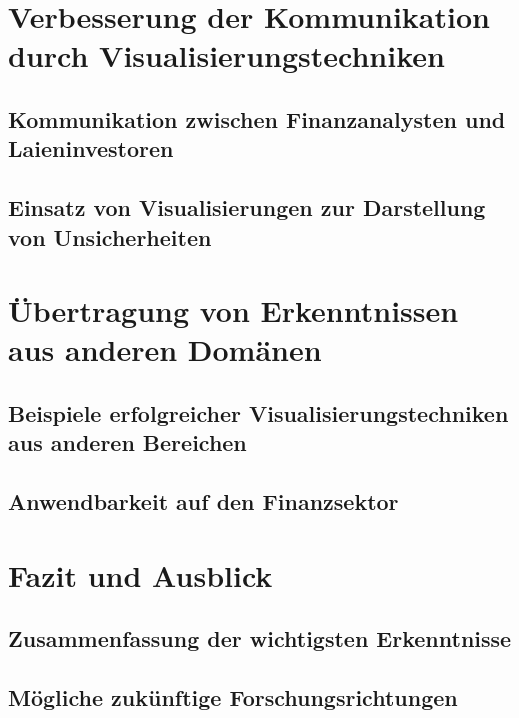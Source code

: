 \section{Verbesserung der Kommunikation durch Visualisierungstechniken}
\subsection{Kommunikation zwischen Finanzanalysten und Laieninvestoren}
\cite{Joslyn2021}
\subsection{Einsatz von Visualisierungen zur Darstellung von Unsicherheiten}

\section{Übertragung von Erkenntnissen aus anderen Domänen}
\subsection{Beispiele erfolgreicher Visualisierungstechniken aus anderen Bereichen}
\cite{Boller2010}
\subsection{Anwendbarkeit auf den Finanzsektor}

\section{Fazit und Ausblick}
\subsection{Zusammenfassung der wichtigsten Erkenntnisse}
\subsection{Mögliche zukünftige Forschungsrichtungen}

